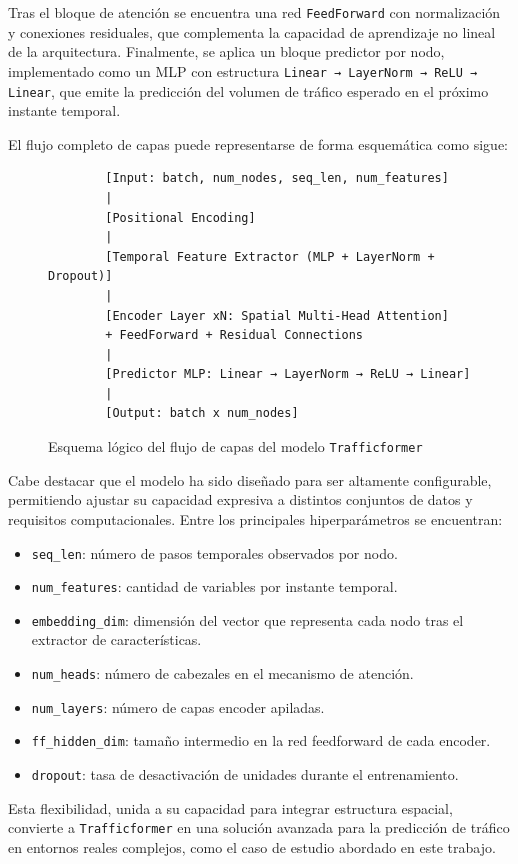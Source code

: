 Tras el bloque de atención se encuentra una red \texttt{FeedForward} con normalización y conexiones residuales, que complementa la capacidad de aprendizaje no lineal de la arquitectura. Finalmente, se aplica un bloque predictor por nodo, implementado como un MLP con estructura \texttt{Linear → LayerNorm → ReLU → Linear}, que emite la predicción del volumen de tráfico esperado en el próximo instante temporal.

El flujo completo de capas puede representarse de forma esquemática como sigue:

\begin{figure}[H]
	\centering
	\caption{Esquema lógico del flujo de capas del modelo \texttt{Trafficformer}}
	\label{fig:trafficformer_vertical}
	\begin{verbatim}
		[Input: batch, num_nodes, seq_len, num_features]
		|
		[Positional Encoding]
		|
		[Temporal Feature Extractor (MLP + LayerNorm + Dropout)]
		|
		[Encoder Layer xN: Spatial Multi-Head Attention]
		+ FeedForward + Residual Connections
		|
		[Predictor MLP: Linear → LayerNorm → ReLU → Linear]
		|
		[Output: batch x num_nodes]
	\end{verbatim}
\end{figure}

Cabe destacar que el modelo ha sido diseñado para ser altamente configurable, permitiendo ajustar su capacidad expresiva a distintos conjuntos de datos y requisitos computacionales. Entre los principales hiperparámetros se encuentran:

\begin{itemize}
	\item \texttt{seq\_len}: número de pasos temporales observados por nodo.
	\item \texttt{num\_features}: cantidad de variables por instante temporal.
	\item \texttt{embedding\_dim}: dimensión del vector que representa cada nodo tras el extractor de características.
	\item \texttt{num\_heads}: número de cabezales en el mecanismo de atención.
	\item \texttt{num\_layers}: número de capas encoder apiladas.
	\item \texttt{ff\_hidden\_dim}: tamaño intermedio en la red feedforward de cada encoder.
	\item \texttt{dropout}: tasa de desactivación de unidades durante el entrenamiento.
\end{itemize}

Esta flexibilidad, unida a su capacidad para integrar estructura espacial, convierte a \texttt{Trafficformer} en una solución avanzada para la predicción de tráfico en entornos reales complejos, como el caso de estudio abordado en este trabajo.

